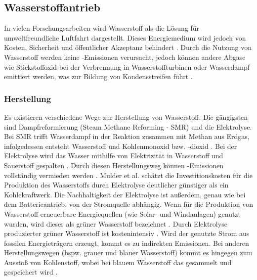 \subsection{Wasserstoffantrieb}
\label{ss:Wasserstoff-Antrieb}

In vielen Forschungsarbeiten wird Wasserstoff als die Lösung für umweltfreundliche Luftfahrt dargestellt.
Dieses Energiemedium wird jedoch von Kosten, Sicherheit und öffentlicher Akzeptanz behindert \cite{ansell2023review}.
Durch die Nutzung von Wasserstoff werden keine -Emissionen verursacht, jedoch können andere Abgase 
wie Stickstoffoxid  bei der Verbrennung in Wasserstoffturbinen oder Wasserdampf emittiert werden, was zur Bildung von Kondensstreifen
führt \cite{hepperle2012electric}.\\

\subsubsection{Herstellung}
Es existieren verschiedene Wege zur Herstellung von Wasserstoff. 
Die gängigsten sind Dampfreformierung (Steam Methane Reforming - SMR) und die Elektrolyse. %
Bei SMR trifft Wasserdampf in der Reaktion zusammen mit Methan aus Erdgas, infolgedessen entsteht 
Wasserstoff  und Kohlenmonoxid  bzw. -dioxid \cite{mulder2019outlook}. Bei der Elektrolyse wird das Wasser mithilfe von Elektrizität 
in Wasserstoff  und Sauerstoff  gespalten \cite{mulder2019outlook}. Durch diesen Herstellungsweg können -Emissionen 
vollständig vermieden werden \cite{dalmia2022powering}. 
Mulder et al. \cite{mulder2019outlook} schätzt die Investitionskosten für die Produktion des Wasserstoffs durch Elektrolyse deutlicher günstiger als ein Kohlekraftwerk.
Die Nachhaltigkeit der Elektrolyse ist außerdem, genau wie bei dem Batterieantrieb, von der Stromquelle abhängig.
%
Wenn für die Produktion von Wasserstoff erneuerbare Energiequellen (wie Solar- und Windanlagen) genutzt wurden, 
wird dieser als grüner Wasserstoff bezeichnet \cite{mulder2019outlook}. 
Durch Elektrolyse produzierter grüner Wasserstoff ist kostenintensiv \cite{dalmia2022powering}.
Wird der genutzte Strom aus fossilen Energieträgern erzeugt, kommt es zu indirekten Emissionen.
Bei anderen Herstellungswegen (bspw. grauer und blauer Wasserstoff) kommt es hingegen zum Ausstoß von Kohlenstoff, 
wobei bei blauem Wasserstoff das  gesammelt und gespeichert wird \cite{mulder2019outlook}.
%
%

